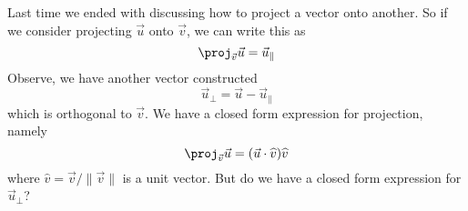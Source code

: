
\M
Last time we ended with discussing how to project a vector onto
another. So if we consider projecting $\vec{u}$ onto $\vec{v}$,
we can write this as
\begin{equation}
\proj_{\vec{v}}\vec{u} = \vec{u}_{\|}
\end{equation}
Observe, we have another vector constructed
\begin{equation}
\vec{u}_{\bot} = \vec{u}-\vec{u}_{\|}
\end{equation}
which is orthogonal to $\vec{v}$. We have a closed form
expression for projection, namely
\begin{equation}
\proj_{\vec{v}}\vec{u} = (\vec{u}\cdot\widehat{v})\widehat{v}
\end{equation}
where $\widehat{v}=\vec{v}/\|\vec{v}\|$ is a unit vector. But do
we have a closed form expression for $\vec{u}_{\bot}$?\more

